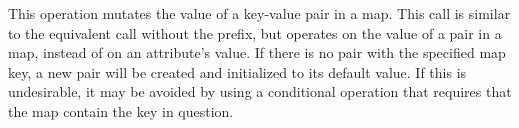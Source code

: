 \item This operation mutates the value of a key-value pair in a map.  This call
    is similar to the equivalent call without the  prefix, but
    operates on the value of a pair in a map, instead of on an attribute's
    value.  If there is no pair with the specified map key, a new pair will be
    created and initialized to its default value.  If this is undesirable, it
    may be avoided by using a conditional operation that requires that the map
    contain the key in question.

